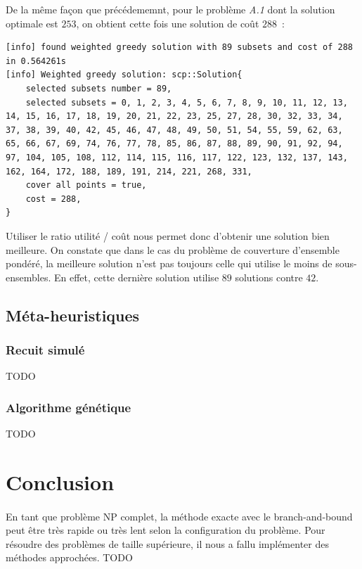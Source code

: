 \documentclass[12pt,letterpaper,twoside]{article}
\begin{document}
			De la même façon que précédememnt, pour le problème \emph{A.1} dont la solution optimale est \(253\), on obtient cette fois
			une solution de coût \(288\) :

			\begin{lstlisting}[breaklines=true]
[info] found weighted greedy solution with 89 subsets and cost of 288 in 0.564261s
[info] Weighted greedy solution: scp::Solution{
	selected subsets number = 89,
	selected subsets = 0, 1, 2, 3, 4, 5, 6, 7, 8, 9, 10, 11, 12, 13, 14, 15, 16, 17, 18, 19, 20, 21, 22, 23, 25, 27, 28, 30, 32, 33, 34, 37, 38, 39, 40, 42, 45, 46, 47, 48, 49, 50, 51, 54, 55, 59, 62, 63, 65, 66, 67, 69, 74, 76, 77, 78, 85, 86, 87, 88, 89, 90, 91, 92, 94, 97, 104, 105, 108, 112, 114, 115, 116, 117, 122, 123, 132, 137, 143, 162, 164, 172, 188, 189, 191, 214, 221, 268, 331, 
	cover all points = true,
	cost = 288,
}
			\end{lstlisting}

			Utiliser le ratio utilité / coût nous permet donc d'obtenir une solution bien meilleure. On constate que dans le cas du
			problème de couverture d'ensemble pondéré, la meilleure solution n'est pas toujours celle qui utilise le moins de
			sous-ensembles. En effet, cette dernière solution utilise \(89\) solutions contre \(42\).
		\subsection{Méta-heuristiques}
			\subsubsection{Recuit simulé}
				TODO
			\subsubsection{Algorithme génétique}
				TODO
	\section{Conclusion}
		\paragraph*{}
			En tant que problème NP complet, la méthode exacte avec le branch-and-bound peut être très rapide ou très lent selon la configuration du problème.
			Pour résoudre des problèmes de taille supérieure, il nous a fallu implémenter des méthodes approchées.
			TODO
	\newpage\printbibliography[heading=bibintoc]{}
\end{document}
